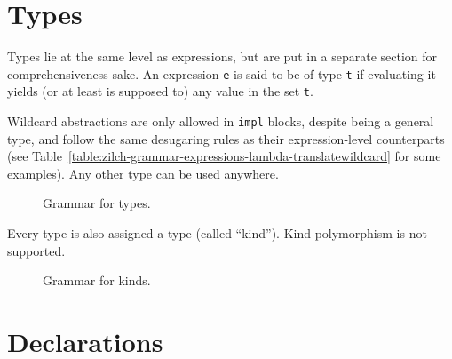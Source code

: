 \section{Types}\label{sec:zilch-grammar-types}

Types lie at the same level as expressions, but are put in a separate section for comprehensiveness sake.
An expression \verb|e| is said to be of type \verb|t| if evaluating it yields (or at least is supposed to) any value in the set \verb|t|.

Wildcard abstractions are only allowed in \verb|impl| blocks, despite being a general type, and follow the same desugaring rules as their expression-level counterparts (see Table~\ref{table:zilch-grammar-expressions-lambda-translatewildcard} for some examples).
Any other type can be used anywhere.

\begin{figure}[H]
	\centering


	\caption{Grammar for types.}
	\label{fig:zilch-grammar-types-grammar}
\end{figure}

Every type is also assigned a type (called ``kind'').
Kind polymorphism is not supported.

\begin{figure}[H]
	\centering


	\caption{Grammar for kinds.}
	\label{fig:zilch-grammar-types-kindgrammar}
\end{figure}

\section{Declarations}\label{sec:zilch-grammar-declarations}

